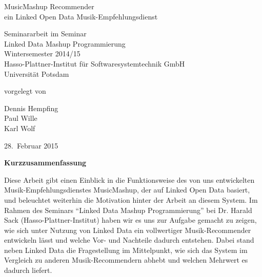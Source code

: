 \documentclass[11pt, a4paper]{article}
\begin{document}
          

\begin{titlepage}
  \begin{center} 
    \mbox{}
    \vspace{1cm}
    
    {\huge MusicMashup Recommender \\[1em] {\LARGE ein Linked Open Data Musik-Empfehlungsdienst}}  
        
    \vspace{5cm}
    
    Seminararbeit im Seminar \\[1em]
    {\large \sc Linked Data Mashup Programmierung} \\[1em]
    Wintersemester 2014/15 \\[1em]
    Hasso-Plattner-Institut für Softwaresystemtechnik GmbH \\[1em]
    Universität Potsdam
    
    \vspace{4cm}
    
		vorgelegt von
		
    \vspace{1em}
    
        {\Large Dennis Hempfing} \\
		{\Large Paul Wille} \\
		{\Large Karl Wolf}
		
    \vspace{4em}
    
    28.~Februar 2015
  \end{center}
\end{titlepage}


\setcounter{page}{1}

\begin{center}
{\bf Kurzzusammenfassung} 
\end{center}

\noindent
Diese Arbeit gibt einen Einblick in die Funktionsweise des von uns entwickelten Musik-Empfehlungsdienstes MusicMashup, der auf Linked Open Data basiert, und beleuchtet weiterhin die Motivation hinter der Arbeit an diesem System. Im Rahmen des Seminars “Linked Data Mashup Programmierung” bei Dr. Harald Sack (Hasso-Plattner-Institut) haben wir es uns zur Aufgabe gemacht zu zeigen, wie sich unter Nutzung von Linked Data ein vollwertiger Musik-Recommender entwickeln lässt und welche Vor- und Nachteile dadurch entstehen.
Dabei stand neben Linked Data die Fragestellung im Mittelpunkt, wie sich das System im Vergleich zu anderen Musik-Recommendern abhebt und welchen Mehrwert es dadurch liefert.
\end{document}
